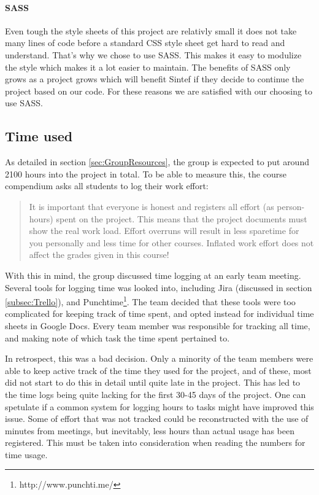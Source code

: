 \documentclass[11pt,a4paper,titlepage,oneside]{report}
\begin{document}
\paragraph{SASS}
Even tough the style sheets of this project are relativly small it does not take many lines of code before a standard \gls{CSS} style sheet get hard to read and understand. That's why we chose to use \gls{SASS}. This makes it easy to modulize the style which makes it a lot easier to maintain. The benefits of \gls{SASS} only grows as a project grows which will benefit Sintef if they decide to continue the project based on our code. For these reasons we are satisfied with our choosing to use \gls{SASS}.

\subsection{Time used}
\label{subsec:TimeUsed}
As detailed in section \ref{sec:GroupResources}, the group is expected to put around 2100 hours into the project in total. To be able to measure this, the \gls{course compendium} asks all students to log their work effort:

\begin{quote}
It is important that everyone is honest and registers all effort (as person-hours) spent on the project. This means that the project documents must show the real work load. Effort overruns will result in less sparetime for you personally and less time for other courses. Inflated work effort does not affect the grades given in this course! \cite{TDT4290:Intro}
\end{quote}

With this in mind, the group discussed time logging at an early team meeting. Several tools for logging time was looked into, including Jira (discussed in section \ref{subsec:Trello}), and Punchtime\footnote{http://www.punchti.me/}. The team decided that these tools were too complicated for keeping track of time spent, and opted instead for individual time sheets in Google Docs. Every team member was responsible for tracking all time, and making note of which task the time spent pertained to. 

In retrospect, this was a bad decision. Only a minority of the team members were able to keep active track of the time they used for the project, and of these, most did not start to do this in detail until quite late in the project. This has led to the time logs being quite lacking for the first 30-45 days of the project. One can spetulate if a common system for logging hours to tasks might have improved this issue. Some of effort that was not tracked could be reconstructed with the use of minutes from meetings, but inevitably, less hours than actual usage has been registered. This must be taken into consideration when reading the numbers for time usage.  
\end{document}
